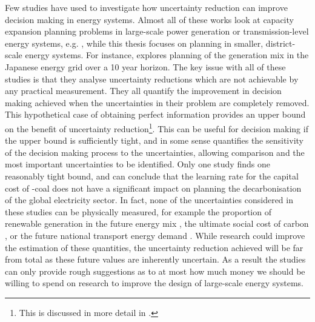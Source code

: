 
Few studies have used  to investigate how uncertainty reduction can improve decision making in energy systems. Almost all of these works look at capacity expansion planning problems in large-scale power generation or transmission-level energy systems, e.g. , while this thesis focuses on planning in smaller, district-scale energy systems. For instance,  explores planning of the generation mix in the Japanese energy grid over a 10 year horizon.
The key issue with all of these studies is that they analyse uncertainty reductions which are not achievable by any practical measurement. They all quantify the improvement in decision making achieved when the uncertainties in their problem are completely removed. This hypothetical case of obtaining perfect information provides an upper bound on the benefit of uncertainty reduction\footnote{This is discussed in more detail in .}. This can be useful for decision making if the upper bound is sufficiently tight, and in some sense quantifies the sensitivity of the decision making process to the uncertainties, allowing comparison and the most important uncertainties to be identified.
Only one study  finds one reasonably tight bound, and can conclude that the learning rate for the capital cost of -coal does not have a significant impact on planning the decarbonisation of the global electricity sector.
In fact, none of the uncertainties considered in these studies can be physically measured, for example the proportion of renewable generation in the future energy mix , the ultimate social cost of carbon , or the future national transport energy demand . While research could improve the estimation of these quantities, the uncertainty reduction achieved will be far from total as these future values are inherently uncertain. As a result the studies can only provide rough suggestions as to at most how much money we should be willing to spend on research to improve the design of large-scale energy systems.

